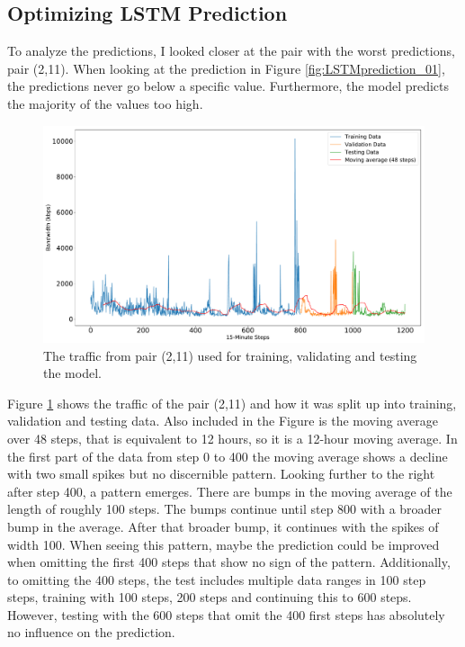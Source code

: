 \subsection{Optimizing LSTM Prediction}\label{optimization}
To analyze the predictions, I looked closer at the pair with the worst predictions, pair (2,11).
When looking at the prediction in Figure \ref{fig:LSTMprediction_01}, the predictions never go below a specific value.
Furthermore, the model predicts the majority of the values too high.
\begin{figure}
	\centering
	\includegraphics[width=0.95\linewidth]{Pictures/Traffic_Analysis/Traffic_rolling_average_2}
	\caption{The traffic from pair (2,11) used for training, validating and testing the model.}
	\label{fig:trafficrollingaverage2}
\end{figure}
Figure \ref{fig:trafficrollingaverage2} shows the traffic of the pair (2,11) and how it was split up into training, validation and testing data.
Also included in the Figure is the moving average over 48 steps, that is equivalent to 12 hours, so it is a 12-hour moving average.
In the first part of the data from step 0 to 400 the moving average shows a decline with two small spikes but no discernible pattern.
Looking further to the right after step 400, a pattern emerges.
There are bumps in the moving average of the length of roughly 100 steps.
The bumps continue until step 800 with a broader bump in the average.
After that broader bump, it continues with the spikes of width 100.
When seeing this pattern, maybe the prediction could be improved when omitting the first 400 steps that show no sign of the pattern.
Additionally, to omitting the 400 steps, the test includes multiple data ranges in 100 step steps, training with 100 steps, 200 steps and continuing this to 600 steps.
However, testing with the 600 steps that omit the 400 first steps has absolutely no influence on the prediction.
